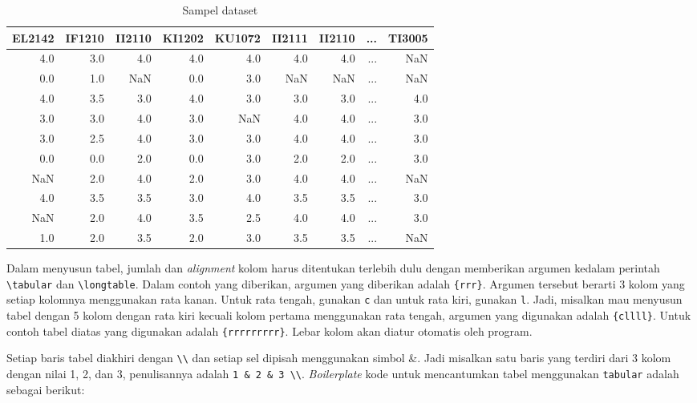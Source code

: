 \begin{table}[H]
    \centering
    \caption{Sampel dataset}
    \label{tabel:sampel_dataset}
    \begin{tabular}{rrrrrrrrr}
     \toprule
     EL2142 & IF1210 & II2110 & KI1202 & KU1072 & II2111 & II2110 & ... & TI3005\\
     \midrule
     4.0 & 3.0 & 4.0 & 4.0 & 4.0 & 4.0 & 4.0 & ... & NaN \\
     0.0 & 1.0 & NaN & 0.0 & 3.0 & NaN & NaN & ... & NaN \\
     4.0 & 3.5 & 3.0 & 4.0 & 3.0 & 3.0 & 3.0 & ... & 4.0 \\
     3.0 & 3.0 & 4.0 & 3.0 & NaN & 4.0 & 4.0 & ... & 3.0 \\
     3.0 & 2.5 & 4.0 & 3.0 & 3.0 & 4.0 & 4.0 & ... & 3.0 \\
     0.0 & 0.0 & 2.0 & 0.0 & 3.0 & 2.0 & 2.0 & ... & 3.0 \\
     NaN & 2.0 & 4.0 & 2.0 & 3.0 & 4.0 & 4.0 & ... & NaN \\
     4.0 & 3.5 & 3.5 & 3.0 & 4.0 & 3.5 & 3.5 & ... & 3.0 \\
     NaN & 2.0 & 4.0 & 3.5 & 2.5 & 4.0 & 4.0 & ... & 3.0 \\
     1.0 & 2.0 & 3.5 & 2.0 & 3.0 & 3.5 & 3.5 & ... & NaN \\
     \bottomrule
    \end{tabular}
\end{table}

Dalam menyusun tabel, jumlah dan \textit{alignment} kolom harus ditentukan terlebih dulu dengan memberikan argumen kedalam perintah \verb|\tabular| dan \verb|\longtable|. Dalam contoh yang diberikan, argumen yang diberikan adalah \verb|{rrr}|. Argumen tersebut berarti 3 kolom yang setiap kolomnya menggunakan rata kanan. Untuk rata tengah, gunakan \texttt{c} dan untuk rata kiri, gunakan \texttt{l}. Jadi, misalkan mau menyusun tabel dengan 5 kolom dengan rata kiri kecuali kolom pertama menggunakan rata tengah, argumen yang digunakan adalah \verb|{cllll}|. Untuk contoh tabel diatas yang digunakan adalah \verb|{rrrrrrrrr}|. Lebar kolom akan diatur otomatis oleh program. 

Setiap baris tabel diakhiri dengan \verb|\\| dan setiap sel dipisah menggunakan simbol \&. Jadi misalkan satu baris yang terdiri dari 3 kolom dengan nilai 1, 2, dan 3, penulisannya adalah \verb|1 & 2 & 3 \\|. \textit{Boilerplate} kode untuk mencantumkan tabel menggunakan \texttt{tabular} adalah sebagai berikut:

